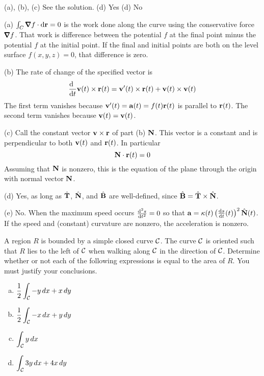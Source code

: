 
\begin{answer} 
(a), (b), (c)  See the solution. \qquad
(d) Yes\qquad
(d) No
\end{answer}


\begin{solution}
(a) $\int_C \vnabla f\cdot \dee{\vr}=0$ is the work done along the
curve using the conservative force $\vnabla f$. That work is difference 
between the potential $f$ at the final point minus the potential $f$ 
at the initial point. If the final and initial points are both on the 
level surface $f(x,y,z)=0$, that difference is zero.

(b) The rate of change of the specified vector is
$$
\diff{\hfill}{t} \vv(t)\times\vr(t)
=\vv'(t)\times\vr(t)+\vv(t)\times\vv(t)
$$
The first term vanishes because $\mathbf{v}'(t)=\mathbf{a}(t)=f(t)\mathbf{r}(t)$ is parallel to $\mathbf{r}(t)$.
The second term vanishes because $\mathbf{v}(t)=\mathbf{v}(t)$.

(c) Call the constant vector $\mathbf{v}\times\mathbf{r}$ of part (b) $\mathbf{N}$. 
This vector is a constant
and is perpendicular to both $\mathbf{v}(t)$ and $\mathbf{r}(t)$. In particular
$$
\mathbf{N}\cdot\mathbf{r}(t)=0
$$
Assuming that $\mathbf{N}$ is nonzero, this is the equation of the plane 
through the origin with normal vector $\mathbf{N}$.

(d) Yes, as long as $\hat{\mathbf{T}}$, $\hat{\mathbf{N}}$, and $\hat{\mathbf{B}}$ are well-defined,
since $\hat{\mathbf{B}} = \hat{\mathbf{T}}\times\hat{\mathbf{N}}$.

(e) No. When the maximum speed occurs $\difftwo{s}{t}=0$ so that
     $\va = \ka(t)\,\big(\diff{s}{t}(t)\big)^2\,\hat\vN(t)$. If the speed
     and (constant) curvature are nonzero, the acceleration is nonzero.
\end{solution}


\begin{question}[M317 2018A] %
A region $R$ is bounded by a simple closed curve $\mathcal{C}$. The curve $\mathcal{C}$ is oriented such that $R$ lies to the left of $\mathcal{C}$ when walking along $\mathcal{C}$
in the direction of $\mathcal{C}$. Determine  whether or not 
each of the following expressions is equal to the area of $R$.
You must justify your conclusions.
\begin{enumerate}[(a)]
\item
$\displaystyle\frac{1}{2} \int_{\mathcal{C}} -y \,d x +x \,d y$
\item
$\displaystyle\frac{1}{2} \int_{\mathcal{C}} -x \,d x + y \,d y$
\item
$\displaystyle\int_{\mathcal{C}} y \,d x$
\item
$\displaystyle\int_{\mathcal{C}} 3y\,d x + 4x \,d y$
\end{enumerate}
\end{question}

